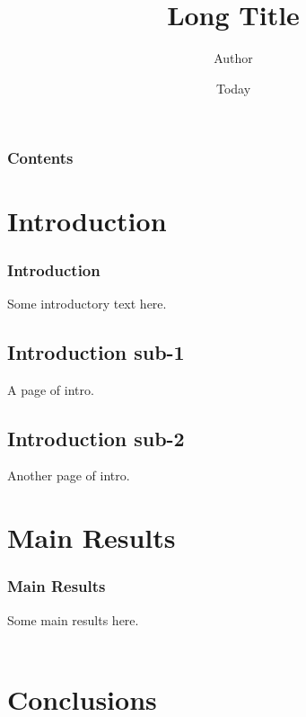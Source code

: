 \documentclass{beamer}
\begin{document}
    \title[Short Title]{Long Title}
    \author[Lastname]{Author}


    \date{Today}


    \begin{frame}
    \titlepage
    \end{frame}


    \begin{frame}
    \frametitle{Contents}
    \tableofcontents
    \end{frame}


    \section{Introduction}

    \begin{frame}
    \frametitle{Introduction}
    Some introductory text here.\\
    \hyperlink{mr<1>}{}
    \end{frame}


    \subsection{Introduction sub-1}
    \begin{frame}
    A page of intro.
    \end{frame}


    \subsection{Introduction sub-2}
    \begin{frame}
    Another page of intro.
    \end{frame}


    \section{Main Results}

    \begin{frame}[label=mr]
    \frametitle{Main Results}
    Some main results here.\\
    \hyperlink{apa<1>}{}\\
    \hyperlink{apb<1>}{}
    \end{frame}


    \section{Conclusions}
\end{document}
